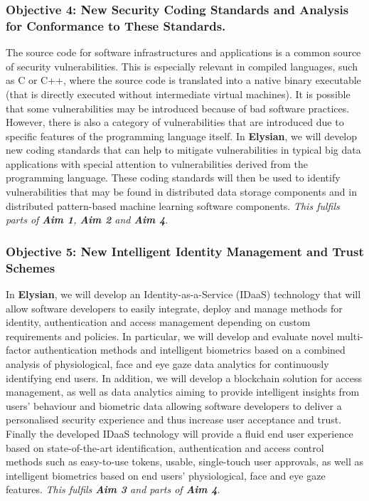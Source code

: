 \documentclass[a4paper,11pt]{article}
\newcommand{\project}[1]{\textbf{#1}\xspace}
\newcommand{\SECURITY}{\project{Elysian}}
\newcommand{\TheProject}{\SECURITY}
\begin{document}
\subsubsection*{Objective 4: New Security Coding Standards and Analysis for Conformance to These Standards.}
The source code for software infrastructures and applications is a common source of security vulnerabilities. This is especially relevant in compiled languages, such as C or C++, where the source code is translated into a native binary executable (that is directly executed without intermediate virtual machines). It is possible that some vulnerabilities may be introduced because of bad software practices. However, there is also a category of vulnerabilities that are introduced due to specific features of the programming language itself.
In \TheProject{}, we will develop new coding standards that can help to mitigate vulnerabilities in typical big data applications with special attention to vulnerabilities derived from  the programming language. %
These coding standards will then be used to identify vulnerabilities that may be found in distributed data storage components and in distributed pattern-based machine learning software components. \emph{This fulfils parts of \textbf{Aim 1}, \textbf{Aim 2} and \textbf{Aim 4}}.

\subsubsection*{Objective 5: New Intelligent Identity Management and Trust Schemes}
\vspace{-6pt}

In \TheProject{}, we will develop an Identity-as-a-Service (IDaaS) technology that will allow software developers to easily integrate, deploy and manage methods for identity, authentication and access management depending on custom requirements and policies. In particular, we will develop and evaluate novel multi-factor authentication methods and intelligent biometrics based on a combined analysis of physiological, face and eye gaze data analytics for continuously identifying end users. In addition, we will develop a blockchain solution for access management, as well as data analytics aiming to provide intelligent insights from users' behaviour and biometric data allowing software developers to deliver a personalised security experience and thus increase user acceptance and trust. Finally the developed IDaaS technology will provide a fluid end user experience based on state-of-the-art identification, authentication and access control methods such as easy-to-use tokens, usable, single-touch user approvals, as well as intelligent biometrics based on end users' physiological, face and eye gaze features. \emph{This fulfils \textbf{Aim 3} and parts of \textbf{Aim 4}}.
\end{document}
